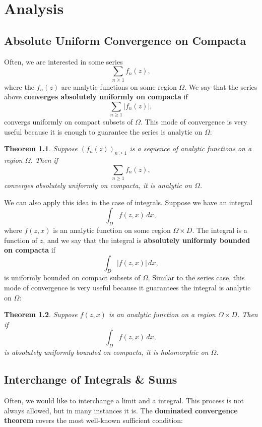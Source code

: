 \documentclass[12pt]{book}
\newtheorem{theorem}{Theorem}[section]
\theoremstyle{definition}\newframedtheorem{method}{Method}
\newcommand{\W}{\Omega}
\newcommand{\x}{\times}
\newcommand{\<}{\langle}
\renewcommand{\>}{\rangle}
\begin{document}
\chapter{Analysis}
  \section{Absolute Uniform Convergence on Compacta}
    Often, we are interested in some series
    \[
      \sum_{n \ge 1}f_{n}(z),
    \]
    where the $f_{n}(z)$ are analytic functions on some region $\W$. We say that the series above \textbf{converges absolutely uniformly on compacta} if
    \[
      \sum_{n \ge 1}|f_{n}(z)|,
    \]
    convergs uniformly on compact subsets of $\W$. This mode of convergence is very useful because it is enough to guarantee the series is analytic on $\W$:

    \begin{theorem}
      Suppose $(f_{n}(z))_{n \ge 1}$ is a sequence of analytic functions on a region $\W$. Then if
      \[
        \sum_{n \ge 1}f_{n}(z),
      \]
      converges absolutely uniformly on compacta, it is analytic on $\W$.
    \end{theorem}

    We can also apply this idea in the case of integrals. Suppose we have an integral
    \[
      \int_{D}f(z,x)\,dx,
    \]
    where $f(z,x)$ is an analytic function on some region $\W \x D$. The integral is a function of $z$, and we say that the integral is \textbf{absolutely uniformly bounded on compacta} if
    \[
      \int_{D}|f(z,x)|\,dx,
    \]
    is uniformly bounded on compact subsets of $\W$. Similar to the series case, this mode of convergence is very useful because it guarantees the integral is analytic on $\W$:

    \begin{theorem}\label{thm:analytic_integral}
      Suppose $f(z,x)$ is an analytic function on a region $\W \x D$. Then if
      \[
        \int_{D}f(z,x)\,dx,
      \]
      is absolutely uniformly bounded on compacta, it is holomorphic on $\W$.
    \end{theorem}
  \section{Interchange of Integrals \& Sums}
    Often, we would like to interchange a limit and a integral. This process is not always allowed, but in many instances it is. The \textbf{dominated convergence theorem} covers the most well-known sufficient condition:
\end{document}
